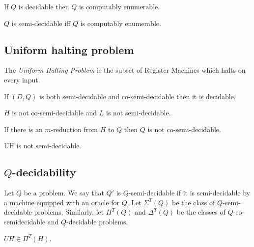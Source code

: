 \documentclass{article}
\begin{document}
\begin{theorem*}[Notes I.25]
	If $Q$ is decidable then $Q$ is computably enumerable.
\end{theorem*}

\begin{theorem*}[Notes I.26, I.27]
	$Q$ is semi-decidable iff $Q$ is computably enumerable.
\end{theorem*}

\subsection{Uniform halting problem}

\begin{definition*}[UH]
	The \emph{Uniform Halting Problem} is the subset of Register Machines
	which halts on every input.
\end{definition*}

\begin{theorem*}[Notes I.28]
	If $(D,Q)$ is both semi-decidable and co-semi-decidable then it is decidable.
\end{theorem*}

\begin{corollary*}
	$H$ is not co-semi-decidable and $L$ is not semi-decidable.
\end{corollary*}

\begin{corollary*}
	If there is an $m$-reduction from $H$ to $Q$ then $Q$ is not co-semi-decidable.
\end{corollary*}

\begin{theorem*}[Notes I.31]
	UH is not semi-decidable.
\end{theorem*}

\subsection{$Q$-decidability}

\begin{definition*}
	Let $Q$ be a problem. We say that $Q'$ is $Q$-semi-decidable if it is semi-decidable
	by a machine equipped with an oracle for $Q$. Let $\Sigma^T(Q)$ be the class of
	$Q$-semi-decidable problems. Similarly, let $\Pi^T(Q)$ and $\Delta^T(Q)$ be the
	classes of $Q$-co-semidecidable and $Q$-decidable problems.
\end{definition*}

\begin{theorem*}
	$UH\in\Pi^T(H)$.
\end{theorem*}
\end{document}
